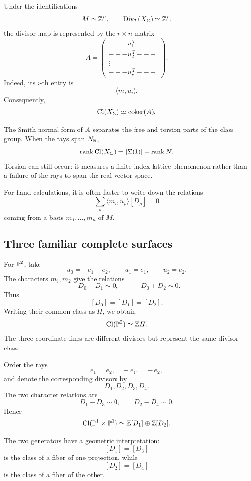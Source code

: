 Under the identifications
\[
M\simeq\mathbb{Z}^n,
\qquad
\operatorname{Div}_T(X_\Sigma)\simeq\mathbb{Z}^r,
\]
the divisor map is represented by the \(r\times n\) matrix
\[
A=
\begin{pmatrix}
---u_1^{\,T}---\\
---u_2^{\,T}---\\
\vdots\\
---u_r^{\,T}---
\end{pmatrix}.
\]
Indeed, its \(i\)-th entry is
\[
\langle m,u_i\rangle.
\]
Consequently,
\[
\operatorname{Cl}(X_\Sigma)
\simeq
\operatorname{coker}(A).
\]

\begin{observation}
The Smith normal form of \(A\) separates the free and torsion parts of
the class group. When the rays span \(N_{\mathbb{R}}\),
\[
\operatorname{rank}\operatorname{Cl}(X_\Sigma)
=
|\Sigma(1)|-\operatorname{rank} N.
\]
Torsion can still occur: it measures a finite-index lattice
phenomenon rather than a failure of the rays to span the real vector
space.
\end{observation}

For hand calculations, it is often faster to write down the
relations
\[
\sum_{\rho}
\langle m_i,u_\rho\rangle[D_\rho]
=
0
\]
coming from a basis \(m_1,\ldots,m_n\) of \(M\).

\subsection{Three familiar complete surfaces}

\begin{example}
For \(\mathbb{P}^2\), take
\[
u_0=-e_1-e_2,
\qquad
u_1=e_1,
\qquad
u_2=e_2.
\]
The characters \(m_1,m_2\) give the relations
\[
-D_0+D_1\sim0,
\qquad
-D_0+D_2\sim0.
\]
Thus
\[
[D_0]=[D_1]=[D_2].
\]
Writing their common class as \(H\), we obtain
\[
\operatorname{Cl}(\mathbb{P}^2)
\simeq
\mathbb{Z} H.
\]
The three coordinate lines are different divisors but represent the
same divisor class.
\end{example}

\begin{example}
Order the rays
\[
e_1,\quad e_2,\quad -e_1,\quad -e_2,
\]
and denote the corresponding divisors by
\[
D_1,D_2,D_3,D_4.
\]
The two character relations are
\[
D_1-D_3\sim0,
\qquad
D_2-D_4\sim0.
\]
Hence
\[
\operatorname{Cl}(\mathbb{P}^1\times\mathbb{P}^1)
\simeq
\mathbb{Z}[D_1]\oplus\mathbb{Z}[D_2].
\]

The two generators have a geometric interpretation:
\[
[D_1]=[D_3]
\]
is the class of a fiber of one projection, while
\[
[D_2]=[D_4]
\]
is the class of a fiber of the other.
\end{example}

